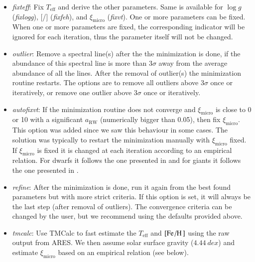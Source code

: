 \documentclass{aa}
\begin{document}
\begin{itemize}
    \item \emph{fixteff}: Fix $T_\mathrm{eff}$ and derive the other parameters.
          Same is available for $\log g$ (\emph{fixlogg}), [/]
          (\emph{fixfeh}), and $\xi_\mathrm{micro}$ (\emph{fixvt}). One or more
          parameters can be fixed. When one or more parameters are fixed, the
          corresponding indicator will be ignored for each iteration, thus the
          parameter itself will not be changed.
    \item \emph{outlier}: Remove a spectral line(s) after the the minimization
          is done, if the abundance of this spectral line is more than $3\sigma$
          away from the average abundance of all the lines. After the removal
          of outlier(s) the minimization routine restarts. The options are to
          remove all outliers above $3\sigma$ once or iteratively, or remove one
          outlier above $3\sigma$ once or iteratively.
    \item \emph{autofixvt}: If the minimization routine does not converge and
          $\xi_\mathrm{micro}$ is close to 0 or 10 with a significant
          $a_\mathrm{RW}$ (numerically bigger than 0.05), then fix
          $\xi_\mathrm{micro}$. This option was added since we saw this
          behaviour in some cases. The solution was typically to restart the
          minimization manually with $\xi_\mathrm{micro}$ fixed. If
          $\xi_\mathrm{micro}$ is fixed it is changed at each iteration
          according to an empirical relation. For dwarfs it follows the one
          presented in \citet{Tsantaki2013} and for giants it follows the one
          presented in \citet{Adibekyan2015}.
    \item \emph{refine}: After the minimization is done, run it again from the best
          found parameters but with more strict criteria. If this option is set,
          it will always be the last step (after removal of outliers). The
          convergence criteria can be changed by the user, but we recommend
          using the defaults provided above.
    \item \emph{tmcalc}: Use TMCalc \citep{Sousa2012} to fast estimate the
          $T_\mathrm{eff}$ and $[\ion{Fe}/\ion{H}]$ using the raw output from
          ARES. We then assume solar surface gravity ($\SI{4.44}{dex}$) and
          estimate $\xi_\mathrm{micro}$ based on an empirical relation (see below).
\end{itemize}
\end{document}
